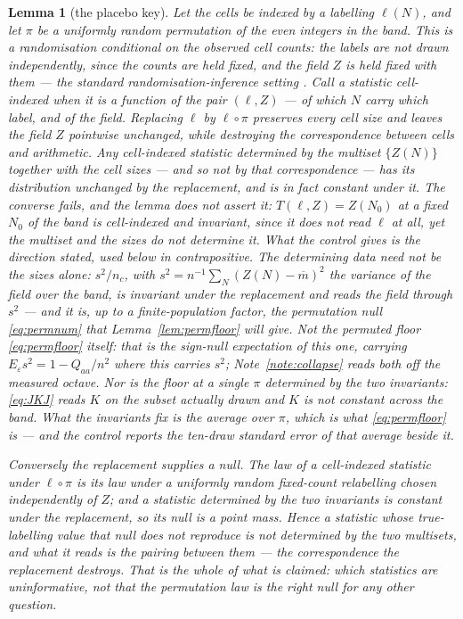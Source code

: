 \documentclass[11pt,a4paper]{article}
\theoremstyle{plain}
\newtheorem{lemma}[theorem]{Lemma}
\theoremstyle{definition}
\theoremstyle{remark}
\begin{document}
\begin{lemma}[the placebo key]\label{lem:placebo}
Let the cells be indexed by a labelling $\ell(N)$, and let $\pi$ be a
uniformly random permutation of the even integers in the band. This is
a randomisation \emph{conditional on the observed cell counts}: the
labels are not drawn independently, since the counts are held fixed,
and the field $Z$ is held fixed with them --- the standard
randomisation-inference setting \cite{LR}. Call a
statistic \emph{cell-indexed} when it is a function of the pair
$(\ell,Z)$ --- of which $N$ carry which label, and of the field.
Replacing $\ell$ by
$\ell\circ\pi$ preserves every cell size and leaves the field $Z$
pointwise unchanged, while destroying the correspondence between cells
and arithmetic. Any cell-indexed statistic determined by the multiset
$\{Z(N)\}$ together with the cell sizes --- and so not by that
correspondence --- has its distribution unchanged by the replacement,
and is in fact constant under it. The converse fails, and the lemma
does not assert it: $T(\ell,Z)=Z(N_0)$ at a fixed $N_0$ of the band is
cell-indexed and invariant, since it does not read $\ell$ at all, yet
the multiset and the sizes do not determine it. What the control gives
is the direction stated, used below in contrapositive.
The determining data need not be the sizes alone:
$s^2/n_c$, with $s^2=n^{-1}\sum_N(Z(N)-\overline m)^2$ the variance of
the field over the band, is invariant under the replacement and reads
the field through $s^2$ --- and it is, up to a finite-population
factor, the permutation null \eqref{eq:permnum} that
Lemma~\ref{lem:permfloor} will give. Not the permuted floor
\eqref{eq:permfloor} itself: that is the sign-null expectation of this
one, carrying $E_\varepsilon s^2=1-Q_{aa}/n^2$ where this carries
$s^2$; Note~\ref{note:collapse} reads both off the measured octave. Nor
is the floor at a single $\pi$ determined by the two invariants:
\eqref{eq:JKJ} reads $K$ on the subset actually drawn and $K$ is not
constant across the band. What the invariants fix is the average over
$\pi$, which is what \eqref{eq:permfloor} is --- and the control
reports the ten-draw standard error of that average beside it.

Conversely the replacement supplies a null. The law of a cell-indexed
statistic under $\ell\circ\pi$ is its law under a uniformly random
fixed-count relabelling chosen independently of $Z$; and a statistic
determined by the two
invariants is constant under the replacement, so its null is a point
mass. Hence a statistic whose true-labelling value that null does not
reproduce is not determined by the two multisets, and what it reads is
the pairing between them --- the correspondence the replacement
destroys. That is the whole of what is claimed: which statistics are
uninformative, not that the permutation law is the right null for any
other question.
\end{lemma}
\end{document}
